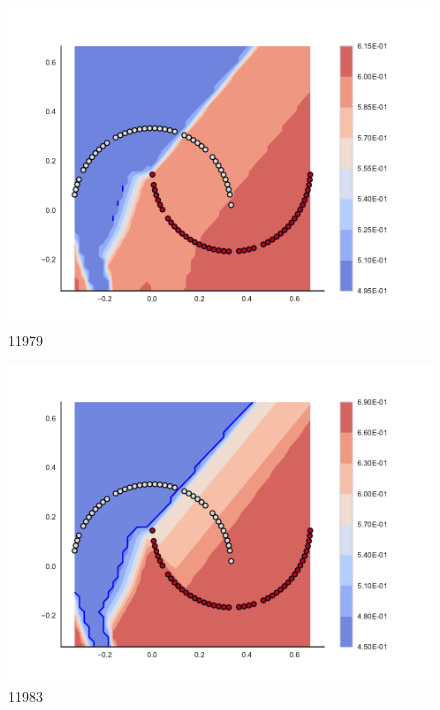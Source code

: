 \begin{subfigure}[b]{0.09\textwidth}
    \includegraphics[clip, trim=2.35cm 1.75cm 4.5cm 0cm,width=\textwidth]{img/convergence/11979.pdf}
    \caption{11979}
    \label{fig:convergence_11979}
\end{subfigure}
%
\begin{subfigure}[b]{0.09\textwidth}
    \includegraphics[clip, trim=2.35cm 1.75cm 4.5cm 0cm,width=\textwidth]{img/convergence/11983.pdf}
    \caption{11983}
    \label{fig:convergence_11983}
\end{subfigure}
%
